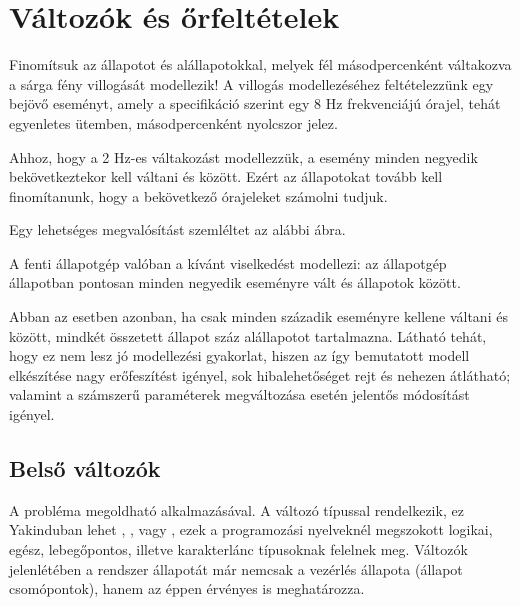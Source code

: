\section{Változók és őrfeltételek}

Finomítsuk az  állapotot  és  alállapotokkal, melyek fél másodpercenként váltakozva a sárga fény villogását modellezik!
A villogás modellezéséhez feltételezzünk egy  bejövő eseményt, amely a specifikáció szerint egy 8 Hz frekvenciájú órajel, tehát egyenletes ütemben, másodpercenként nyolcszor jelez.

Ahhoz, hogy a 2 Hz-es váltakozást modellezzük, a  esemény minden negyedik bekövetkeztekor kell váltani  és  között. Ezért az állapotokat tovább kell finomítanunk, hogy a bekövetkező órajeleket számolni tudjuk.

Egy lehetséges megvalósítást szemléltet az alábbi ábra.


A fenti állapotgép valóban a kívánt viselkedést modellezi: az állapotgép  állapotban pontosan minden negyedik  eseményre vált  és  állapotok között.

Abban az esetben azonban, ha csak minden századik eseményre kellene váltani  és  között, mindkét összetett állapot száz alállapotot tartalmazna. Látható tehát, hogy ez nem lesz jó modellezési gyakorlat, hiszen az így bemutatott modell elkészítése nagy erőfeszítést igényel, sok hibalehetőséget rejt és nehezen átlátható; valamint a számszerű paraméterek megváltozása esetén jelentős módosítást igényel.

\subsection{Belső változók}

A probléma megoldható  alkalmazásával. A változó típussal rendelkezik, ez Yakinduban lehet , ,  vagy , ezek a programozási nyelveknél megszokott logikai, egész, lebegőpontos, illetve karakterlánc típusoknak felelnek meg. Változók jelenlétében a rendszer állapotát már nemcsak a vezérlés állapota (állapot csomópontok), hanem az éppen érvényes  is meghatározza.

